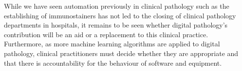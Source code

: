 \documentclass[12pt]{article}
\begin{document}
While we have seen automation previously in clinical pathology such as the establishing of immunostainers has not led 
to the closing of clinical pathology departments in hospitals, it remains to be seen whether digital pathology's 
contribution will be an aid or a replacement to this clinical practice. Furthermore, as more machine learning algorithms 
are applied to digital pathology, clinical practitioners must decide whether they are appropriate and that there is 
accountability for the behaviour of software and equipment.

\printbibliography
\end{document}
